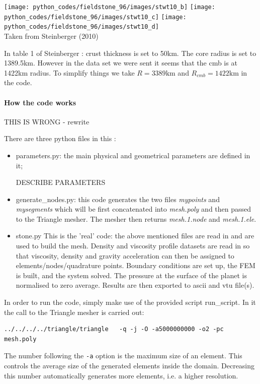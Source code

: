 \begin{center}
\texttt{[image: python\_codes/fieldstone\_96/images/stwt10\_b]}
\texttt{[image: python\_codes/fieldstone\_96/images/stwt10\_c]}
\texttt{[image: python\_codes/fieldstone\_96/images/stwt10\_d]}\\
{\captionfont Taken from Steinberger \etal (2010) \cite{stwt10}}
\end{center}

In table 1 of Steinberger \etal \cite{stwt10}: crust thickness is set to 50km. The core radius is set 
to 1389.5km. However in the data set we were sent it seems that the cmb is at 1422\si{\km}
radius.
To simplify things we take $R=3389\si{\km}$ and $R_{cmb}=1422\si{\km}$ in the code.


\paragraph{How the code works}

THIS IS WRONG - rewrite

There are three python files in this \stone:
\begin{itemize}
\item {\pythonfile parameters.py}: the main physical and geometrical parameters are defined in it;

DESCRIBE PARAMETERS

\item {\pythonfile generate\_nodes.py}: this code generates the two files  {\sl mypoints} and {\sl mysegments}
which will be first concatenated into {\sl mesh.poly} and then passed to the Triangle mesher. 
The mesher then returns {\sl mesh.1.node} and {\sl mesh.1.ele}.  
\item {\pythonfile stone.py} This is the 'real' code: the above mentioned files are read in and are used to 
build the mesh. Density and viscosity profile datasets are read in so that viscosity, density and 
gravity acceleration can then be assigned to elements/nodes/quadrature points. Boundary conditions 
are set up, the FEM is built, and the system solved. The pressure at the surface of the planet is 
normalised to zero average. Results are then exported to ascii and vtu file(s).
\end{itemize}
In order to run the code, simply make use of the provided script {\shellscriptfile run\_script}. 
In it the call to the Triangle mesher is carried out:
\begin{verbatim}
../../../../triangle/triangle   -q -j -O -a5000000000 -o2 -pc  mesh.poly
\end{verbatim}
The number following the {\tt -a} option is the maximum size of an element. This controls the 
average size of the generated elements inside the domain. Decreasing this number automatically 
generates more elements, i.e. a higher resolution. 

